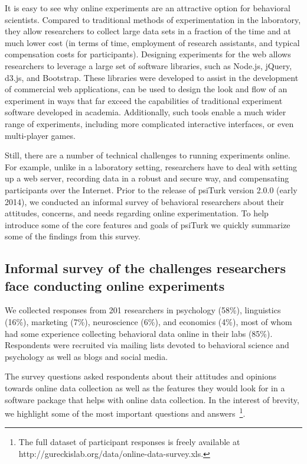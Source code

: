 \documentclass[twocolumn]{svjour3}          %
\newcommand{\psiturk}[0]{\textsf{psiTurk}}
\begin{document}
It is easy to see why online experiments are an attractive option for behavioral 
scientists.  Compared to traditional methods of experimentation in the laboratory,
they allow researchers to collect large data sets in a fraction of the time and at 
much lower cost (in terms of time, employment of research assistants, and typical 
compensation costs for participants).  Designing experiments for the web allows 
researchers to leverage a large set of software libraries, such as Node.js, jQuery, d3.js, 
and Bootstrap. These libraries were developed to assist 
in the development of commercial web applications, can be used to design the look and flow of an 
experiment in ways 
that far exceed the capabilities of traditional experiment software developed 
in academia.  Additionally, such tools enable a much wider range of experiments, 
including more complicated interactive interfaces, or even multi-player games.

Still, there are a number of technical challenges to running experiments online.
For example, unlike in a laboratory setting, researchers have to 
deal with setting up a web server, recording data in a robust and secure way, 
and compensating participants over the Internet.  
Prior to the release of \psiturk{} version
2.0.0 (early 2014), we conducted an informal survey of behavioral researchers 
about their attitudes, concerns, and needs regarding online experimentation. 
To help introduce some of the core features and goals of \psiturk{} we 
quickly summarize some of the findings from this survey.



\subsection{Informal survey of the challenges researchers face conducting online experiments}
 We collected responses from 201 researchers in psychology (58\%),
linguistics (16\%), marketing (7\%), neuroscience (6\%), and economics (4\%), most of 
whom had some experience collecting behavioral data online in their labs (85\%).  
Respondents were recruited via mailing lists devoted to behavioral science and psychology 
as well as blogs and social media. 

The survey questions asked respondents about their attitudes and opinions towards
online data collection as well as the features they would look for in a software package
that helps with online data collection.  In the interest of brevity, we highlight some of the
most important questions and answers~\footnote{The full dataset of participant responses
is freely available at \textsf{http://gureckislab.org/data/online-data-survey.xls}.}.
\end{document}
